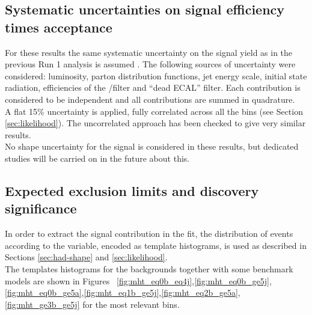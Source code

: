 \subsection{Systematic uncertainties on signal efficiency times acceptance}
\label{sec:sig-syst}

For these results the same systematic uncertainty on the signal yield 
as in the previous Run 1 analysis is assumed \cite{CMS_AN_2013-366}. 
The following sources of uncertainty were considered: 
luminosity, parton distribution
functions, jet energy scale, initial state radiation, 
efficiencies of the \mht/\met filter and ``dead ECAL'' filter. 
Each contribution is considered to be independent and all contributions are
summed in quadrature. \\
A flat 15\% uncertainty is applied, fully correlated across all the bins (see Section \ref{sec:likelihood}). 
The uncorrelated approach has been checked to give very similar results. \\
No shape uncertainty for the signal is considered in these results, 
but dedicated studies will be carried on in the future about this.


\subsection{Expected exclusion limits and discovery significance}
\label{subsec:susy_results}

In order to extract the signal contribution in the fit, the distribution of events according to the \mht variable, 
encoded as template histograms, is used as described in Sections \ref{sec:had-shape} and \ref{sec:likelihood}. \\
The \mht templates histograms for the backgrounds together with some benchmark models are shown in Figures ~\ref{fig:mht_eq0b_eq4j},\ref{fig:mht_eq0b_ge5j},\ref{fig:mht_eq0b_ge5a},\ref{fig:mht_eq1b_ge5j},\ref{fig:mht_eq2b_ge5a},\ref{fig:mht_ge3b_ge5j} for the most relevant \HT bins. 

